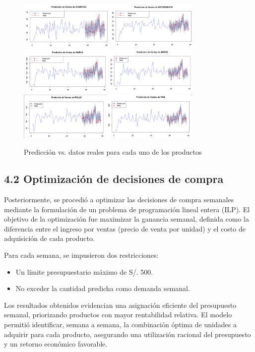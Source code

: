\documentclass[12pt]{article}
\begin{document}
\begin{figure}[H]
    \centering
    \includegraphics[width=0.8\textwidth]{Ima11.png}
    \includegraphics[width=0.8\textwidth]{Ima22.png}
    \includegraphics[width=0.8\textwidth]{Ima33.png}
    \caption{Predicción vs. datos reales para cada uno de los productos}
\end{figure}

\subsection*{4.2 Optimización de decisiones de compra}

Posteriormente, se procedió a optimizar las decisiones de compra semanales mediante la formulación de un problema de programación lineal entera (ILP). El objetivo de la optimización fue maximizar la ganancia semanal, definida como la diferencia entre el ingreso por ventas (precio de venta por unidad) y el costo de adquisición de cada producto.

Para cada semana, se impusieron dos restricciones:
\begin{itemize}
    \item Un límite presupuestario máximo de S/. 500.
    \item No exceder la cantidad predicha como demanda semanal.
\end{itemize}

Los resultados obtenidos evidencian una asignación eficiente del presupuesto semanal, priorizando productos con mayor rentabilidad relativa. El modelo permitió identificar, semana a semana, la combinación óptima de unidades a adquirir para cada producto, asegurando una utilización racional del presupuesto y un retorno económico favorable.
\end{document}
